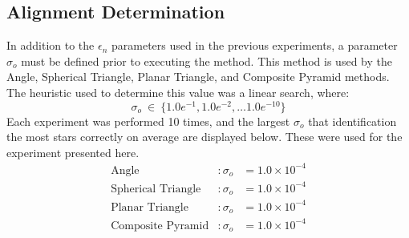 \subsection{Alignment Determination}\label{subsec:alignmentDeterminationAnalysis}
In addition to the $\epsilon_n$ parameters used in the previous experiments, a parameter $\sigma_o$ must be defined
prior to executing the  method.
This method is used by the Angle, Spherical Triangle, Planar Triangle, and Composite Pyramid methods.
The heuristic used to determine this value was a linear search, where:
\begin{equation}
    \label{eq:gridSearchSigma}
    \sigma_o \ \in \ \{1.0e^{-1}, 1.0e^{-2}, \ldots 1.0e^{-10}\}
\end{equation}
Each experiment was performed 10 times, and the largest $\sigma_o$ that identification the most stars correctly on
average are displayed below.
These were used for the experiment presented here.
\begin{align*}
    \text{Angle}&: \sigma_o &= 1.0 \times 10^{-4}\\
    \text{Spherical Triangle}&: \sigma_o &= 1.0 \times 10^{-4}\\
    \text{Planar Triangle}&: \sigma_o &= 1.0 \times 10^{-4}\\
    \text{Composite Pyramid}&: \sigma_o &= 1.0 \times 10^{-4}\\
\end{align*}

